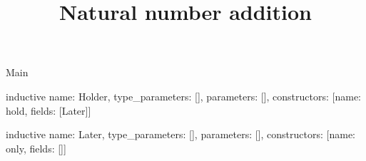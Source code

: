 \begin{lexlean}{Main}
\title{Natural number addition}
\begin{semanticmodule}
inductive{
  name: Holder,
  type_parameters: [],
  parameters: [],
  constructors: [{name: hold, fields: [Later]}]
}

inductive{
  name: Later,
  type_parameters: [],
  parameters: [],
  constructors: [{name: only, fields: []}]
}
\end{semanticmodule}
\end{lexlean}
